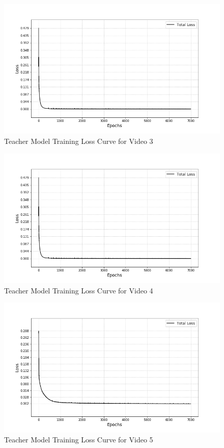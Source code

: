 \begin{figure}[H]
    \centering
    \includegraphics[height=0.6\linewidth]{assets/audio_video_loss_curves/video1_loss.png}
    \caption{Teacher Model Training Loss Curve for Video 3}
    \label{fig:video-loss-curve-3}
\end{figure}

\begin{figure}[H]
    \centering
    \includegraphics[height=0.6\linewidth]{assets/audio_video_loss_curves/video1_loss.png}
    \caption{Teacher Model Training Loss Curve for Video 4}
    \label{fig:video-loss-curve-4}
\end{figure}

\begin{figure}[H]
    \centering
    \includegraphics[height=0.6\linewidth]{assets/audio_video_loss_curves/video5_loss.png}
    \caption{Teacher Model Training Loss Curve for Video 5}
    \label{fig:video-loss-curve-5}
\end{figure}


